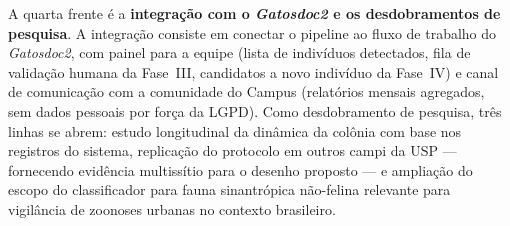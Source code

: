 A quarta frente é a \textbf{integração com o \emph{Gatosdoc2} e os desdobramentos de pesquisa}. A integração consiste em conectar o pipeline ao fluxo de trabalho do \emph{Gatosdoc2}, com painel para a equipe (lista de indivíduos detectados, fila de validação humana da Fase~III, candidatos a novo indivíduo da Fase~IV) e canal de comunicação com a comunidade do Campus (relatórios mensais agregados, sem dados pessoais por força da LGPD). Como desdobramento de pesquisa, três linhas se abrem: estudo longitudinal da dinâmica da colônia com base nos registros do sistema, replicação do protocolo em outros campi da USP --- fornecendo evidência multissítio para o desenho proposto --- e ampliação do escopo do classificador para fauna sinantrópica não-felina relevante para vigilância de zoonoses urbanas no contexto brasileiro.

